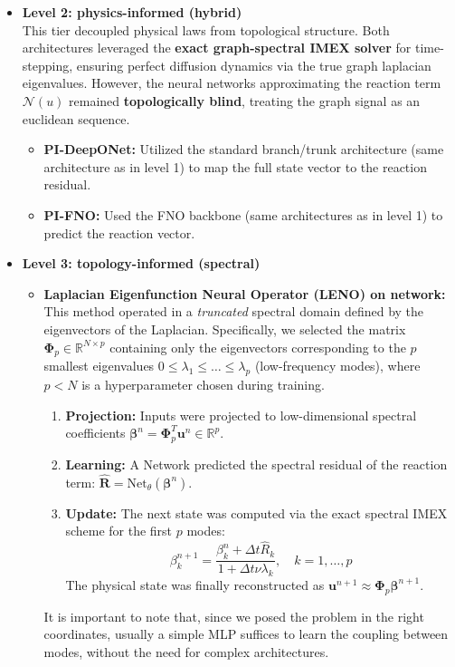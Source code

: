 \begin{itemize}
\item \textbf{Level 2: physics-informed (hybrid)}\\
This tier decoupled physical laws from topological structure. Both architectures leveraged the \textbf{exact graph-spectral IMEX solver} for time-stepping, ensuring perfect diffusion dynamics via the true graph laplacian eigenvalues. However, the neural networks approximating the reaction term $\mathcal{N}(u)$ remained \textbf{topologically blind}, treating the graph signal as an euclidean sequence.
\begin{itemize}
    \item \textbf{PI-DeepONet:} Utilized the standard branch/trunk architecture (same architecture as in level 1) to map the full state vector to the reaction residual.
    \item \textbf{PI-FNO:} Used the FNO backbone (same architectures as in level 1) to predict the reaction vector. 
\end{itemize}

    \item \textbf{Level 3: topology-informed (spectral)}
    \begin{itemize}
        \item \textbf{Laplacian Eigenfunction Neural Operator (LENO) on network:} 
        This method operated in a \textit{truncated} spectral domain defined by the eigenvectors of the Laplacian.
Specifically, we selected the matrix $\mathbf{\Phi}_p \in \mathbb{R}^{N \times p}$ containing only the eigenvectors corresponding to the $p$ smallest eigenvalues $0 \le \lambda_1 \le \dots \le \lambda_p$ (low-frequency modes), where $p < N$ is a hyperparameter chosen during training.

\begin{enumerate}
    \item \textbf{Projection:} Inputs were projected to low-dimensional spectral coefficients $\boldsymbol{\beta}^n = \mathbf{\Phi}_p^T \mathbf{u}^n \in \mathbb{R}^p$.
    \item \textbf{Learning:} A Network predicted the spectral residual of the reaction term: $\hat{\mathbf{R}} = \text{Net}_{\theta}(\boldsymbol{\beta}^n)$.
    \item \textbf{Update:} The next state was computed via the exact spectral IMEX scheme for the first $p$ modes:
    \begin{equation}
        \beta_k^{n+1} = \frac{\beta_k^n + \Delta t \hat{R}_k}{1 + \Delta t \nu \lambda_k}, \quad k=1,\dots,p
    \end{equation}
    The physical state was finally reconstructed as $\mathbf{u}^{n+1} \approx \mathbf{\Phi}_p \boldsymbol{\beta}^{n+1}$.
\end{enumerate}
It is important to note that, since we posed the problem in the right coordinates, usually a simple MLP suffices to learn the coupling between modes, 
without the need for complex architectures.


\end{itemize}
\end{itemize}
